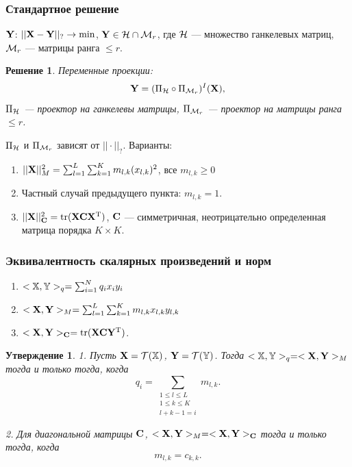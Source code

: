 \documentclass[unicode, notheorems]{beamer}
\newtheorem{proposition}{Утверждение}
\newtheorem{solution}{Решение}
\begin{document}
\begin{frame}
    \frametitle{Стандартное решение}
    $\mathbf{Y}$: $||\mathbf{X} - \mathbf{Y}||_? \to \min$, $\mathbf{Y} \in \mathcal{H} \cap \mathcal{M}_r$, где $\mathcal{H}$ --- множество ганкелевых матриц, $\mathcal{M}_r$ --- матрицы ранга $\le r$.

    \begin{solution}
    
    Переменные проекции: 
    \begin{equation*}
    \mathbf{Y} = (\Pi_{\mathcal{H}} \circ \Pi_{\mathcal{M}_r})^I (\mathbf{X}),
    \end{equation*}
    $\Pi_{\mathcal{H}}$ --- проектор на ганкелевы матрицы, $\Pi_{\mathcal{M}_r}$ --- проектор на матрицы ранга $\le r$.
    \end{solution}

    $\Pi_{\mathcal{H}}$ и $\Pi_{\mathcal{M}_r}$ зависят от $||\cdot||_?$. Варианты:
    \begin{enumerate}
    \item $||\mathbf{X}||_M^2 = \sum_{l = 1}^L \sum_{k = 1}^K m_{l, k} (x_{l, k})^2$, все $m_{l, k} \ge 0$
    \item Частный случай предыдущего пункта: $m_{l, k} = 1$.
    \item $||\mathbf{X}||_{\mathbf{C}}^2 = \text{tr}(\mathbf{X} \mathbf{C} \mathbf{X}^{\mathrm{T}})$, $\mathbf{C}$ --- симметричная, неотрицательно определенная матрица порядка $K \times K$.
    \end{enumerate}
\end{frame}

\begin{frame}
    \frametitle{Эквивалентность скалярных произведений и норм}

    \begin{enumerate}
    \item $<\mathbb{X}, \mathbb{Y}>_q = \sum_{i=1}^N q_i x_i  y_i$
    \item $<\mathbf{X}, \mathbf{Y}>_M = \sum_{l = 1}^L \sum_{k = 1}^K m_{l, k} x_{l, k} y_{l, k}$
    \item $<\mathbf{X}, \mathbf{Y}>_{\mathbf{C}} = \text{tr}(\mathbf{X} \mathbf{C} \mathbf{Y}^{\mathrm{T}})$.
    \end{enumerate}
    \begin{proposition}
1. Пусть $\mathbf{X} = \mathcal{T}(\mathbb{X})$,  $\mathbf{Y} = \mathcal{T}(\mathbb{Y})$. Тогда $<\mathbb{X},\mathbb{Y}>_q= <\mathbf{X},\mathbf{Y}>_M$ тогда и только тогда, когда
\begin{equation*}
q_i = \sum_{\substack{1 \le l \le L \\ 1 \le k \le K \\ l+k-1=i}} m_{l,k}.
\end{equation*}

2. Для диагональной матрицы $\mathbf{C}$, $<\mathbf{X},\mathbf{Y}>_M= <\mathbf{X},\mathbf{Y}>_{\mathbf{C}}$ тогда и только тогда, когда
\begin{equation*}
m_{l,k}=c_{k,k}.
\end{equation*}
\end{proposition}

\end{frame}
\end{document}
